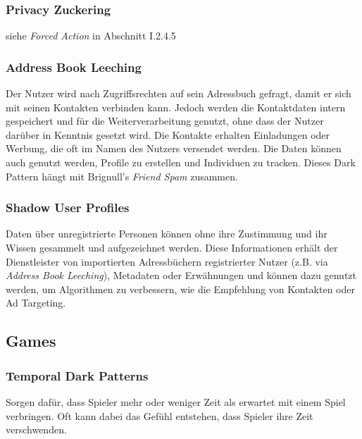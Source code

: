 \documentclass[a4paper]{article}
\newcommand{\todo}[1]{{\color{purple}{#1}}}
\begin{document}
\subsubsection{Privacy Zuckering}
siehe \textit{Forced Action} in Abschnitt I.2.4.5

\subsubsection{Address Book Leeching}
Der Nutzer wird nach Zugriffsrechten auf sein Adressbuch gefragt, damit er sich mit seinen Kontakten verbinden kann. Jedoch werden die Kontaktdaten intern gespeichert und für die Weiterverarbeitung genutzt, ohne dass der Nutzer darüber in Kenntnis gesetzt wird. Die Kontakte erhalten Einladungen oder Werbung, die oft im Namen des Nutzers versendet werden. Die Daten können auch genutzt werden, Profile zu erstellen und Individuen zu tracken.\newline
Dieses Dark Pattern hängt mit Brignull's \textit{Friend Spam} zusammen. \todo{erläutern?}

\subsubsection{Shadow User Profiles}
Daten über unregistrierte Personen können ohne ihre Zustimmung und ihr Wissen gesammelt und aufgezeichnet werden. Diese Informationen erhält der Dienstleister von importierten Adressbüchern registrierter Nutzer (z.B. via \textit{Address Book Leeching}), Metadaten oder Erwähnungen und können dazu genutzt werden, um Algorithmen zu verbessern, wie die Empfehlung von Kontakten oder Ad Targeting.


\subsection{Games}
\label{sub:games}
\todo{DPs in Games beschreiben}


\subsubsection{Temporal Dark Patterns}
Sorgen dafür, dass Spieler mehr oder weniger Zeit als erwartet mit einem Spiel verbringen. Oft kann dabei das Gefühl entstehen, dass Spieler ihre Zeit verschwenden.
\end{document}
